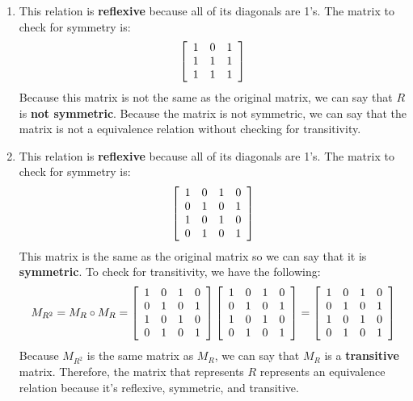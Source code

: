 \documentclass[11pt]{article}
\begin{document}
\begin{enumerate}
    \item This relation is \textbf{reflexive} because all of its diagonals are 1's. The matrix to check for symmetry is:
    \[
    \left[
    \begin{array}{c c c}
         1 & 0 & 1 \\
         1 & 1 & 1 \\
         1 & 1 & 1
    \end{array}
    \right]
    \]
    Because this matrix is not the same as the original matrix, we can say that $R$ is \textbf{not symmetric}. Because the matrix is not symmetric, we can say that the matrix is not a equivalence relation without checking for transitivity.
    
    \item This relation is \textbf{reflexive} because all of its diagonals are 1's. The matrix to check for symmetry is:
    \[
    \left[
    \begin{array}{c c c c}
         1 & 0 & 1 & 0 \\
         0 & 1 & 0 & 1 \\
         1 & 0 & 1 & 0 \\
         0 & 1 & 0 & 1
    \end{array}
    \right]
    \]
    This matrix is the same as the original matrix so we can say that it is \textbf{symmetric}. To check for transitivity, we have the following:
    \[
    M_{R^2} = M_R \circ M_R =
    \left[
    \begin{array}{c c c c}
         1 & 0 & 1 & 0 \\
         0 & 1 & 0 & 1 \\
         1 & 0 & 1 & 0 \\
         0 & 1 & 0 & 1
    \end{array}
    \right]
    \left[
    \begin{array}{c c c c}
         1 & 0 & 1 & 0 \\
         0 & 1 & 0 & 1 \\
         1 & 0 & 1 & 0 \\
         0 & 1 & 0 & 1
    \end{array}
    \right]
    =
    \left[
    \begin{array}{c c c c}
         1 & 0 & 1 & 0 \\
         0 & 1 & 0 & 1 \\
         1 & 0 & 1 & 0 \\
         0 & 1 & 0 & 1
    \end{array}
    \right]
    \]
    Because $M_{R^2}$ is the same matrix as $M_R$, we can say that $M_R$ is a \textbf{transitive} matrix. Therefore, the matrix that represents $R$ represents an equivalence relation because it's reflexive, symmetric, and transitive.
    

\end{enumerate}
\end{document}
